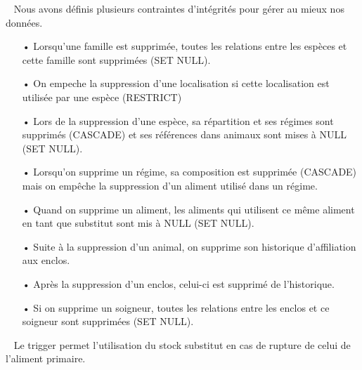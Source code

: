 \documentclass[12pt,a4paper,titlepage]{report}
\begin{document}
~ \newline
Nous avons définis plusieurs contraintes d'intégrités pour gérer au mieux nos données.
\begin{itemize}
	\item[•] Lorsqu'une famille est supprimée, toutes les relations entre les espèces et cette famille sont supprimées (SET NULL).
	\item[•] On empeche la suppression d'une localisation si cette localisation est utilisée par une espèce (RESTRICT)
	\item[•] Lors de la suppression d'une espèce, sa répartition et ses régimes sont supprimés (CASCADE) et ses références dans animaux sont mises à NULL (SET NULL). 
	\item[•] Lorsqu'on supprime un régime, sa composition est supprimée (CASCADE) mais on empêche la suppression d'un aliment utilisé dans un régime.
	\item[•] Quand on supprime un aliment, les aliments qui utilisent ce même aliment en tant que substitut sont mis à NULL (SET NULL).
	\item[•] Suite à la suppression d'un animal, on supprime son historique d'affiliation aux enclos.
	\item[•] Après la suppression d'un enclos,  celui-ci est supprimé de l'historique.
	\item[•] Si on supprime un soigneur, toutes les relations entre les enclos et ce soigneur sont supprimées (SET NULL).
\end{itemize}

~ \newline
Le trigger permet l'utilisation du stock substitut en cas de rupture de celui de l'aliment primaire.
\end{document}
